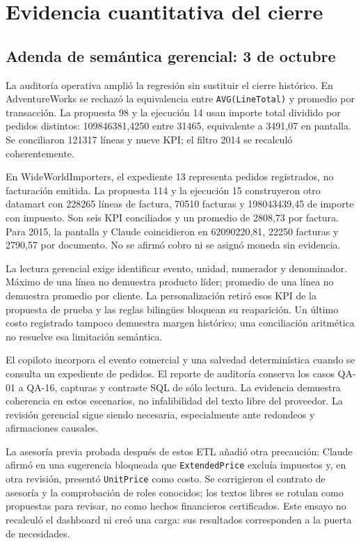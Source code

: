 \documentclass[11pt,letterpaper]{article}
\newcommand{\file}[1]{\texttt{#1}}
\begin{document}
\section{Evidencia cuantitativa del cierre}

\subsection{Adenda de semántica gerencial: 3 de octubre}

La auditoría operativa amplió la regresión sin sustituir el cierre histórico. En
AdventureWorks se rechazó la equivalencia entre \file{AVG(LineTotal)} y promedio por
transacción. La propuesta 98 y la ejecución 14 usan importe total dividido por pedidos
distintos: 109846381,4250 entre 31465, equivalente a 3491,07 en pantalla. Se conciliaron
121317 líneas y nueve KPI; el filtro 2014 se recalculó coherentemente.

En WideWorldImporters, el expediente 13 representa pedidos registrados, no facturación
emitida. La propuesta 114 y la ejecución 15 construyeron otro datamart con 228265 líneas
de factura, 70510 facturas y 198043439,45 de importe con impuesto. Son seis KPI
conciliados y un promedio de 2808,73 por factura. Para 2015, la pantalla y Claude
coincidieron en 62090220,81, 22250 facturas y 2790,57 por documento. No se afirmó cobro
ni se asignó moneda sin evidencia.

La lectura gerencial exige identificar evento, unidad, numerador y denominador. Máximo
de una línea no demuestra producto líder; promedio de una línea no demuestra promedio
por cliente. La personalización retiró esos KPI de la propuesta de prueba y las reglas
bilingües bloquean su reaparición. Un último costo registrado tampoco demuestra margen
histórico; una conciliación aritmética no resuelve esa limitación semántica.

El copiloto incorpora el evento comercial y una salvedad determinística cuando se
consulta un expediente de pedidos. El reporte de auditoría conserva los casos QA-01
a QA-16, capturas y contraste SQL de sólo lectura. La evidencia demuestra coherencia
en estos escenarios, no infalibilidad del texto libre del proveedor. La revisión
gerencial sigue siendo necesaria, especialmente ante redondeos y afirmaciones causales.

La asesoría previa probada después de estos ETL añadió otra precaución: Claude afirmó
en una sugerencia bloqueada que \file{ExtendedPrice} excluía impuestos y, en otra
revisión, presentó \file{UnitPrice} como costo. Se corrigieron el contrato de asesoría
y la comprobación de roles conocidos; los textos libres se rotulan como propuestas
para revisar, no como hechos financieros certificados. Este ensayo no recalculó el
dashboard ni creó una carga: sus resultados corresponden a la puerta de necesidades.
\end{document}
